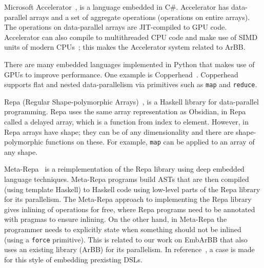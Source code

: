 \documentclass[a4paper]{book}
\begin{document}
Microsoft Accelerator~\citet{ACCELERATOR}, is a language embedded in C\#. Accelerator has
data-parallel arrays and a set of aggregate operations (operations on entire arrays). The 
operations on data-parallel arrays are JIT-compiled to GPU code. Accelerator can also 
compile to multithreaded CPU code and make use of SIMD units of modern 
CPUs~\citet{ACCELERATORCPU}; this makes the Accelerator system related to ArBB. 

There are many embedded languages implemented in Python that makes use of GPUs 
to improve performance. One example is Copperhead~\citet{copperhead}. Copperhead 
supports flat and nested data-parallelism via primitives such as {\tt map} and 
{\tt reduce}.  


Repa (Regular Shape-polymorphic Arrays)~\citet{REPA}, is a Haskell library for 
data-parallel programming. 
Repa uses the same array representation as Obsidian, in Repa called a delayed
array, which is a function from index to element. However, in Repa arrays have shape; 
they can be of any dimensionality and there are shape-polymorphic functions on these. 
For example, {\tt map} can be applied to an array of any shape. 

Meta-Repa~\citet{METAREPA} is a reimplementation of the Repa library using deep embedded language 
techniques. Meta-Repa programs build ASTs that are then compiled (using template 
Haskell) to Haskell code using low-level parts of the Repa library for its parallelism.
The Meta-Repa approach to implementing the Repa library 
gives inlining of operations for free, where Repa programs need to be annotated 
with pragmas to ensure inlining. On the other hand, in Meta-Repa the programmer 
needs to explicitly state when something should not be inlined (using a {\tt force} primitive).
This is related to our work on EmbArBB that also uses an existing library (ArBB) 
for its parallelism. In reference~\citet{FPCDSL}, a case is made for this style 
of embedding prexisting DSLs. 
\end{document}
